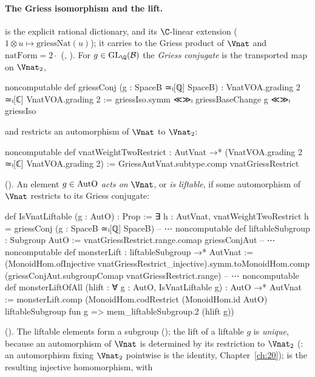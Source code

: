 \paragraph{The Griess isomorphism and the lift.}   is the explicit
rational dictionary, and  its $\C$-linear extension
($1\otimes u\mapsto\mathrm{griessNat}(u)$); it carries  to the Griess product of $\Vnat$ and
$\mathrm{natForm}=2\cdot$ (, ).  For
$g\in\mathrm{GL}_\Q(\chtwentytwoB)$ the \emph{Griess conjugate} is the transported map on $\Vnat_2$,
\begin{leancode}
noncomputable def griessConj (g : SpaceB ≃ₗ[ℚ] SpaceB) :
    VnatVOA.grading 2 ≃ₗ[ℂ] VnatVOA.grading 2 :=
  griessIso.symm ≪≫ₗ griessBaseChange g ≪≫ₗ griessIso
\end{leancode}
and  restricts an automorphism of $\Vnat$ to $\Vnat_2$:
\begin{leancode}
noncomputable def vnatWeightTwoRestrict : AutVnat →* (VnatVOA.grading 2 ≃ₗ[ℂ] VnatVOA.grading 2) :=
  GriessAutVnat.subtype.comp vnatGriessRestrict
\end{leancode}
().  An element $g\in\mathrm{AutO}$ \emph{acts on}
$\Vnat$, or \emph{is liftable}, if some automorphism of $\Vnat$ restricts to its Griess conjugate:
\begin{leancode}
def IsVnatLiftable (g : AutO) : Prop :=
  ∃ h : AutVnat, vnatWeightTwoRestrict h = griessConj (g : SpaceB ≃ₗ[ℚ] SpaceB)
-- ⋯
noncomputable def liftableSubgroup : Subgroup AutO :=
  vnatGriessRestrict.range.comap griessConjAut
-- ⋯
noncomputable def monsterLift : liftableSubgroup →* AutVnat :=
  (MonoidHom.ofInjective vnatGriessRestrict_injective).symm.toMonoidHom.comp
    (griessConjAut.subgroupComap vnatGriessRestrict.range)
-- ⋯
noncomputable def monsterLiftOfAll (hlift : ∀ g : AutO, IsVnatLiftable g) : AutO →* AutVnat :=
  monsterLift.comp (MonoidHom.codRestrict (MonoidHom.id AutO) liftableSubgroup
    fun g => mem_liftableSubgroup.2 (hlift g))
\end{leancode}
().  The liftable elements form a subgroup
(); the lift of a liftable $g$ is \emph{unique}, because an automorphism of $\Vnat$ is
determined by its restriction to $\Vnat_2$ (: an automorphism fixing
$\Vnat_2$ pointwise is the identity, Chapter~\ref{ch:20});  is the resulting injective homomorphism, with
